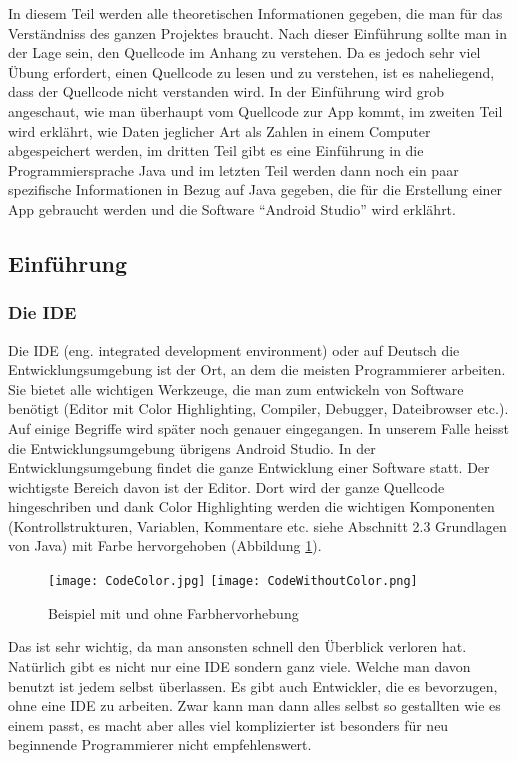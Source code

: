 In diesem Teil werden alle theoretischen Informationen gegeben, die man für das Verständniss des ganzen Projektes braucht. Nach dieser Einführung sollte man in der Lage sein, den Quellcode im Anhang zu verstehen. Da es jedoch sehr viel Übung erfordert, einen Quellcode zu lesen und zu verstehen, ist es naheliegend, dass der Quellcode nicht verstanden wird. In der Einführung wird grob angeschaut, wie man überhaupt vom Quellcode zur App kommt, im zweiten Teil wird erklährt, wie Daten jeglicher Art als Zahlen in einem Computer abgespeichert werden, im dritten Teil gibt es eine Einführung in die Programmiersprache Java und im letzten Teil werden dann noch ein paar spezifische Informationen in Bezug auf Java gegeben, die für die Erstellung einer App gebraucht werden und die Software "`Android Studio"' wird erklährt.

\subsection{Einführung}
\subsubsection{Die IDE}
Die IDE (eng. integrated development environment) oder auf Deutsch die Entwicklungsumgebung ist der Ort, an dem die meisten Programmierer arbeiten. Sie bietet alle wichtigen Werkzeuge, die man zum entwickeln von Software benötigt (Editor mit Color Highlighting, Compiler, Debugger, Dateibrowser etc.). Auf einige Begriffe wird später noch genauer eingegangen. In unserem Falle heisst die Entwicklungsumgebung übrigens Android Studio. In der Entwicklungsumgebung findet die ganze Entwicklung einer Software statt. Der wichtigste Bereich davon ist der Editor. Dort wird der ganze Quellcode hingeschriben und dank Color Highlighting werden die wichtigen Komponenten (Kontrollstrukturen, Variablen, Kommentare etc. siehe Abschnitt 2.3 Grundlagen von Java) mit Farbe hervorgehoben (Abbildung \ref{fig:Colorhighlighting}).
\begin{figure}[htbp] 
  \centering
     \texttt{[image: CodeColor.jpg]}
     \texttt{[image: CodeWithoutColor.png]}
  \caption{Beispiel mit und ohne Farbhervorhebung \cite{Colorhighlighting}}
  \label{fig:Colorhighlighting}
\end{figure}
Das ist sehr wichtig, da man ansonsten schnell den Überblick verloren hat. Natürlich gibt es nicht nur eine IDE sondern ganz viele. Welche man davon benutzt ist jedem selbst überlassen. Es gibt auch Entwickler, die es bevorzugen, ohne eine IDE zu arbeiten. Zwar kann man dann alles selbst so gestallten wie es einem passt, es macht aber alles viel komplizierter ist besonders für neu beginnende Programmierer nicht empfehlenswert.

